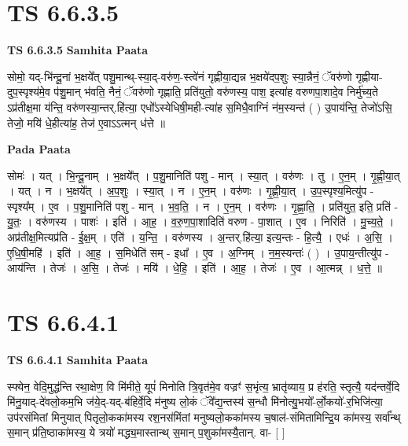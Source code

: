 \documentclass[17pt]{extarticle}
\begin{document}
\section*{ TS 6.6.3.5 }

\textbf{TS 6.6.3.5 } \newline
\textbf{Samhita Paata} \newline

सोमो॒ यद्-भि॑न्दू॒नां भ॒क्षये᳚त् पशु॒मान्थ्-स्या॒द्-वरु॑ण॒-स्त्वे॑नं गृह्णीया॒द्यन्न भ॒क्षये॑दप॒शुः स्या॒न्नैनं॒ ॅवरु॑णो गृह्णीया-दुप॒स्पृश्य॑मे॒व प॑शु॒मान् भ॑वति॒ नैनं॒ ॅवरु॑णो गृह्णाति॒ प्रति॑युतो॒ वरु॑णस्य॒ पाश॒ इत्या॑ह वरुणपा॒शादे॒व निर्मु॑च्य॒ते ऽप्र॑तीक्ष॒मा य॑न्ति॒ वरु॑णस्या॒न्तर्.हि॑त्या॒ एधो᳚ऽस्येधिषी॒मही-त्या॑ह स॒मिधै॒वाग्निं न॑म॒स्यन्त॑ ( ) उ॒पाय॑न्ति॒ तेजो॑ऽसि॒ तेजो॒ मयि॑ धे॒हीत्या॑ह॒ तेज॑ ए॒वाऽऽत्मन् ध॑त्ते ॥ \newline

\textbf{Pada Paata} \newline

सोमः॑ । यत् । भि॒न्दू॒नाम् । भ॒क्षये᳚त् । प॒शु॒मानिति॑ पशु - मान् । स्या॒त् । वरु॑णः । तु । ए॒न॒म् । गृ॒ह्णी॒या॒त् । यत् । न । भ॒क्षये᳚त् । अ॒प॒शुः । स्या॒त् । न । ए॒न॒म् । वरु॑णः । गृ॒ह्णी॒या॒त् । उ॒प॒स्पृश्य॒मित्यु॑प - स्पृश्य᳚म् । ए॒व । प॒शु॒मानिति॑ पशु - मान् । भ॒व॒ति॒ । न । ए॒न॒म् । वरु॑णः । गृ॒ह्णा॒ति॒ । प्रति॑युत॒ इति॒ प्रति॑ - यु॒तः॒ । वरु॑णस्य । पाशः॑ । इति॑ । आ॒ह॒ । व॒रु॒ण॒पा॒शादिति॑ वरुण - पा॒शात् । ए॒व । निरिति॑ । मु॒च्य॒ते॒ । अप्र॑तीक्ष॒मित्यप्र॑ति - ई॒क्ष॒म् । एति॑ । य॒न्ति॒ । वरु॑णस्य । अ॒न्तर्.हि॑त्या॒ इत्य॒न्तः - हि॒त्यै॒ । एधः॑ । अ॒सि॒ । ए॒धि॒षी॒महि॑ । इति॑ । आ॒ह॒ । स॒मिधेति॑ सम् - इधा᳚ । ए॒व । अ॒ग्निम् । न॒म॒स्यन्तः॑ ( ) । उ॒पाय॒न्तीत्यु॑प - आय॑न्ति । तेजः॑ । अ॒सि॒ । तेजः॑ । मयि॑ । धे॒हि॒ । इति॑ । आ॒ह॒ । तेजः॑ । ए॒व । आ॒त्मन्न् । ध॒त्ते॒ ॥  \newline




\section*{ TS 6.6.4.1 }

\textbf{TS 6.6.4.1 } \newline
\textbf{Samhita Paata} \newline

स्फ्येन॒ वेदि॒मुद्ध॑न्ति रथा॒क्षेण॒ वि मि॑मीते॒ यूपं॑ मिनोति त्रि॒वृत॑मे॒व वज्रꣳ॑ स॒भृंत्य॒ भ्रातृ॑व्याय॒ प्र ह॑रति॒ स्तृत्यै॒ यद॑न्तर्वे॒दि मि॑नु॒याद्-दे॑वलो॒कम॒भि ज॑ये॒द्-यद्-ब॑हिर्वे॒दि म॑नुष्य लो॒कं ॅवे᳚द्य॒न्तस्य॑ स॒न्धौ मि॑नोत्यु॒भयो᳚-र्लो॒कयो॑-र॒भिजि॑त्या॒ उप॑रसंमितां मिनुयात् पितृलो॒कका॑मस्य रश॒नस॑मिंतां मनुष्यलो॒कका॑मस्य च॒षाल॑-संमितामिन्द्रि॒य का॑मस्य॒ सर्वा᳚न्थ् स॒मान् प्र॑ति॒ष्ठाका॑मस्य॒ ये त्रयो॑ मद्ध्य॒मास्तान्थ् स॒मान् प॒शुका॑मस्यै॒तान्. वा- [  ] \newline
\end{document}
